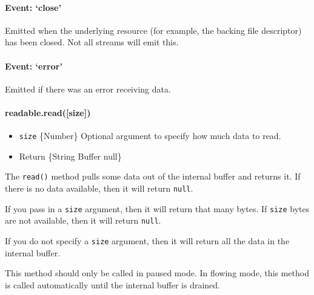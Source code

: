 \paragraph{Event: `close'}\label{event-close}

Emitted when the underlying resource (for example, the backing file
descriptor) has been closed. Not all streams will emit this.

\paragraph{Event: `error'}\label{event-error}

Emitted if there was an error receiving data.

\paragraph{readable.read({[}size{]})}\label{readable.readsize}

\begin{itemize}
\itemsep1pt\parskip0pt
\item
  \texttt{size} \{Number\} Optional argument to specify how much data to
  read.
\item
  Return \{String \textbar{} Buffer \textbar{} null\}
\end{itemize}

The \texttt{read()} method pulls some data out of the internal buffer
and returns it. If there is no data available, then it will return
\texttt{null}.

If you pass in a \texttt{size} argument, then it will return that many
bytes. If \texttt{size} bytes are not available, then it will return
\texttt{null}.

If you do not specify a \texttt{size} argument, then it will return all
the data in the internal buffer.

This method should only be called in paused mode. In flowing mode, this
method is called automatically until the internal buffer is drained.

\begin{Shaded}
\end{Shaded}

